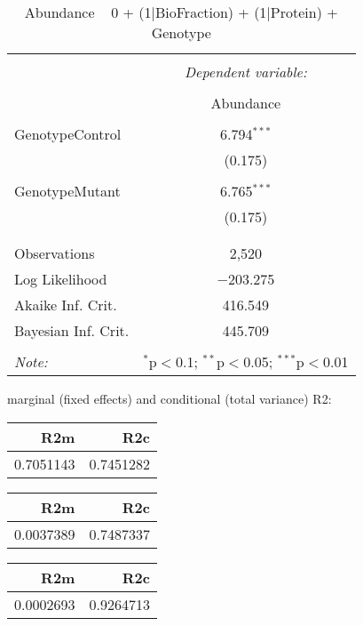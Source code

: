 \documentclass[11pt]{report}
\begin{document}
\begin{table}[!htbp] \centering 
  \caption{Abundance ~ 0 + (1|BioFraction) + (1|Protein) + Genotype} 
  \label{} 
\begin{tabular}{@{\extracolsep{5pt}}lc} 
\\[-1.8ex]\hline 
\hline \\[-1.8ex] 
 & \multicolumn{1}{c}{\textit{Dependent variable:}} \\ 
\cline{2-2} 
\\[-1.8ex] & Abundance \\ 
\hline \\[-1.8ex] 
 GenotypeControl & 6.794$^{***}$ \\ 
  & (0.175) \\ 
  & \\ 
 GenotypeMutant & 6.765$^{***}$ \\ 
  & (0.175) \\ 
  & \\ 
\hline \\[-1.8ex] 
Observations & 2,520 \\ 
Log Likelihood & $-$203.275 \\ 
Akaike Inf. Crit. & 416.549 \\ 
Bayesian Inf. Crit. & 445.709 \\ 
\hline 
\hline \\[-1.8ex] 
\textit{Note:}  & \multicolumn{1}{r}{$^{*}$p$<$0.1; $^{**}$p$<$0.05; $^{***}$p$<$0.01} \\ 
\end{tabular} 
\end{table} 
marginal (fixed effects) and conditional (total variance) R2:

\begin{tabular}{r|r}
\hline
R2m & R2c\\
\hline
0.7051143 & 0.7451282\\
\hline
\end{tabular}

\begin{tabular}{r|r}
\hline
R2m & R2c\\
\hline
0.0037389 & 0.7487337\\
\hline
\end{tabular}

\begin{tabular}{r|r}
\hline
R2m & R2c\\
\hline
0.0002693 & 0.9264713\\
\hline
\end{tabular}
\end{document}
